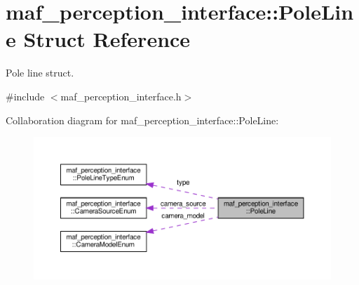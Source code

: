 \hypertarget{structmaf__perception__interface_1_1PoleLine}{}\section{maf\+\_\+perception\+\_\+interface\+:\+:Pole\+Line Struct Reference}
\label{structmaf__perception__interface_1_1PoleLine}


Pole line struct.  




{\ttfamily \#include $<$maf\+\_\+perception\+\_\+interface.\+h$>$}



Collaboration diagram for maf\+\_\+perception\+\_\+interface\+:\+:Pole\+Line\+:\nopagebreak
\begin{figure}[H]
\begin{center}
\leavevmode
\includegraphics[width=350pt]{structmaf__perception__interface_1_1PoleLine__coll__graph}
\end{center}
\end{figure}
